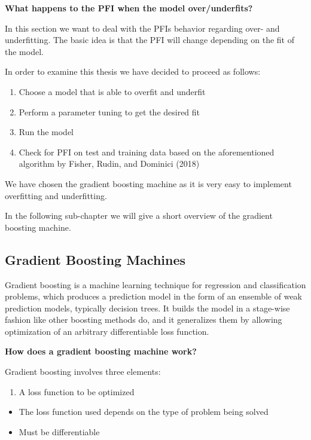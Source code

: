 \documentclass[]{krantz}
\providecommand{\tightlist}{%
  \setlength{\itemsep}{0pt}\setlength{\parskip}{0pt}}
\begin{document}
\textbf{What happens to the PFI when the model over/underfits?}

In this section we want to deal with the PFIs behavior regarding over-
and underfitting. The basic idea is that the PFI will change depending
on the fit of the model.

In order to examine this thesis we have decided to proceed as follows:

\begin{enumerate}
\def\labelenumi{\arabic{enumi}.}
\item
  Choose a model that is able to overfit and underfit
\item
  Perform a parameter tuning to get the desired fit
\item
  Run the model
\item
  Check for PFI on test and training data based on the aforementioned
  algorithm by Fisher, Rudin, and Dominici (2018)
\end{enumerate}

We have chosen the gradient boosting machine as it is very easy to
implement overfitting and underfitting.

In the following sub-chapter we will give a short overview of the
gradient boosting machine.

\subsection{Gradient Boosting
Machines}\label{gradient-boosting-machines}

Gradient boosting is a machine learning technique for regression and
classification problems, which produces a prediction model in the form
of an ensemble of weak prediction models, typically decision trees. It
builds the model in a stage-wise fashion like other boosting methods do,
and it generalizes them by allowing optimization of an arbitrary
differentiable loss function.

\textbf{How does a gradient boosting machine work?}

Gradient boosting involves three elements:

\begin{enumerate}
\def\labelenumi{\arabic{enumi}.}
\tightlist
\item
  A loss function to be optimized
\end{enumerate}

\begin{itemize}
\tightlist
\item
  The loss function used depends on the type of problem being solved
\item
  Must be differentiable
\end{itemize}
\end{document}
